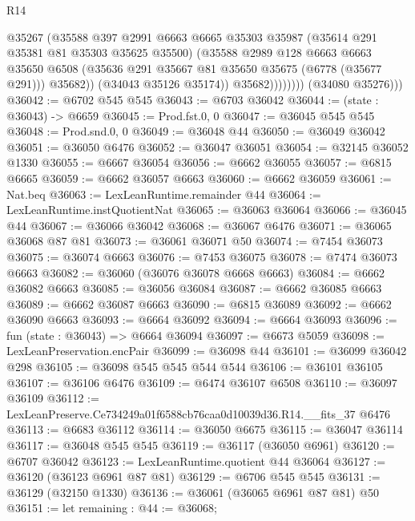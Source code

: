 \begin{lexlean}{R14}
\begin{coremodule}
                          @35267
                          (@35588
                            @397
                            @2991
                            @6663
                            @6665
                            @35303
                            @35987
                            (@35614 @291 @35381 @81 @35303 @35625 @35500)
                            (@35588
                              @2989
                              @128
                              @6663
                              @6663
                              @35650
                              @6508
                              (@35636 @291 @35667 @81 @35650 @35675 (@6778 (@35677 @291)))
                              @35682))
                          (@34043 @35126 @35174))
                        @35682))))))))
        (@34080 @35276)))
@36042 := @6702 @545 @545
@36043 := @6703 @36042
@36044 := (state : @36043) -> @6659
@36045 := Prod.fst.{0, 0}
@36047 := @36045 @545 @545
@36048 := Prod.snd.{0, 0}
@36049 := @36048 @44
@36050 := @36049 @36042
@36051 := @36050 @6476
@36052 := @36047 @36051
@36054 := @32145 @36052 @1330
@36055 := @6667 @36054
@36056 := @6662 @36055
@36057 := @6815 @6665
@36059 := @6662 @36057 @6663
@36060 := @6662 @36059
@36061 := Nat.beq
@36063 := LexLeanRuntime.remainder @44
@36064 := LexLeanRuntime.instQuotientNat
@36065 := @36063 @36064
@36066 := @36045 @44
@36067 := @36066 @36042
@36068 := @36067 @6476
@36071 := @36065 @36068 @87 @81
@36073 := @36061 @36071 @50
@36074 := @7454 @36073
@36075 := @36074 @6663
@36076 := @7453 @36075
@36078 := @7474 @36073 @6663
@36082 := @36060 (@36076 @36078 @6668 @6663)
@36084 := @6662 @36082 @6663
@36085 := @36056 @36084
@36087 := @6662 @36085 @6663
@36089 := @6662 @36087 @6663
@36090 := @6815 @36089
@36092 := @6662 @36090 @6663
@36093 := @6664 @36092
@36094 := @6664 @36093
@36096 := fun (state : @36043) => @6664 @36094
@36097 := @6673 @5059
@36098 := LexLeanPreservation.encPair
@36099 := @36098 @44
@36101 := @36099 @36042 @298
@36105 := @36098 @545 @545 @544 @544
@36106 := @36101 @36105
@36107 := @36106 @6476
@36109 := @6474 @36107 @6508
@36110 := @36097 @36109
@36112 := LexLeanPreserve.Ce734249a01f6588cb76caa0d10039d36.R14.__fits_37 @6476
@36113 := @6683 @36112
@36114 := @36050 @6675
@36115 := @36047 @36114
@36117 := @36048 @545 @545
@36119 := @36117 (@36050 @6961)
@36120 := @6707 @36042
@36123 := LexLeanRuntime.quotient @44 @36064
@36127 := @36120 (@36123 @6961 @87 @81)
@36129 := @6706 @545 @545
@36131 := @36129 (@32150 @1330)
@36136 := @36061 (@36065 @6961 @87 @81) @50
@36151 := let remaining : @44 := @36068;

\end{coremodule}
\end{lexlean}
